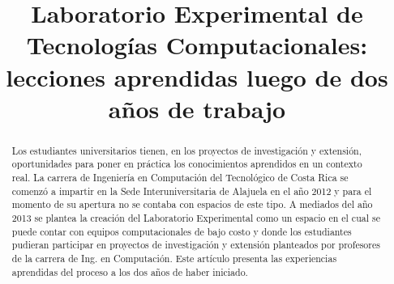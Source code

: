 \documentclass[conference]{IEEEtran}
\begin{document}
\title{
    Laboratorio Experimental de Tecnologías Computacionales: lecciones
    aprendidas luego de dos años de trabajo}

\author{

    \and

    \and
}

\maketitle


\begin{abstract}

Los estudiantes universitarios tienen, en los proyectos de investigación y
extensión, oportunidades para poner en práctica los conocimientos aprendidos en
un contexto real. La carrera de Ingeniería en Computación del Tecnológico de
Costa Rica se comenzó a impartir en la Sede Interuniversitaria de Alajuela en el
año 2012 y para el momento de su apertura no se contaba con espacios de este
tipo. A mediados del año 2013 se plantea la creación del Laboratorio
Experimental como un espacio en el cual se puede contar con equipos
computacionales de bajo costo y donde los estudiantes pudieran participar en
proyectos de investigación y extensión planteados por profesores de la carrera
de Ing. en Computación. Este artículo presenta las experiencias aprendidas del
proceso a los dos años de haber iniciado. 


\end{abstract}
\end{document}
